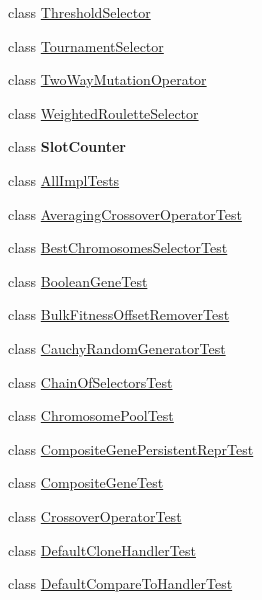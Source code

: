 \begin{DoxyCompactItemize}
\item 
class \hyperlink{classorg_1_1jgap_1_1impl_1_1_threshold_selector}{Threshold\-Selector}
\item 
class \hyperlink{classorg_1_1jgap_1_1impl_1_1_tournament_selector}{Tournament\-Selector}
\item 
class \hyperlink{classorg_1_1jgap_1_1impl_1_1_two_way_mutation_operator}{Two\-Way\-Mutation\-Operator}
\item 
class \hyperlink{classorg_1_1jgap_1_1impl_1_1_weighted_roulette_selector}{Weighted\-Roulette\-Selector}
\item 
class {\bfseries Slot\-Counter}
\item 
class \hyperlink{classorg_1_1jgap_1_1impl_1_1_all_impl_tests}{All\-Impl\-Tests}
\item 
class \hyperlink{classorg_1_1jgap_1_1impl_1_1_averaging_crossover_operator_test}{Averaging\-Crossover\-Operator\-Test}
\item 
class \hyperlink{classorg_1_1jgap_1_1impl_1_1_best_chromosomes_selector_test}{Best\-Chromosomes\-Selector\-Test}
\item 
class \hyperlink{classorg_1_1jgap_1_1impl_1_1_boolean_gene_test}{Boolean\-Gene\-Test}
\item 
class \hyperlink{classorg_1_1jgap_1_1impl_1_1_bulk_fitness_offset_remover_test}{Bulk\-Fitness\-Offset\-Remover\-Test}
\item 
class \hyperlink{classorg_1_1jgap_1_1impl_1_1_cauchy_random_generator_test}{Cauchy\-Random\-Generator\-Test}
\item 
class \hyperlink{classorg_1_1jgap_1_1impl_1_1_chain_of_selectors_test}{Chain\-Of\-Selectors\-Test}
\item 
class \hyperlink{classorg_1_1jgap_1_1impl_1_1_chromosome_pool_test}{Chromosome\-Pool\-Test}
\item 
class \hyperlink{classorg_1_1jgap_1_1impl_1_1_composite_gene_persistent_repr_test}{Composite\-Gene\-Persistent\-Repr\-Test}
\item 
class \hyperlink{classorg_1_1jgap_1_1impl_1_1_composite_gene_test}{Composite\-Gene\-Test}
\item 
class \hyperlink{classorg_1_1jgap_1_1impl_1_1_crossover_operator_test}{Crossover\-Operator\-Test}
\item 
class \hyperlink{classorg_1_1jgap_1_1impl_1_1_default_clone_handler_test}{Default\-Clone\-Handler\-Test}
\item 
class \hyperlink{classorg_1_1jgap_1_1impl_1_1_default_compare_to_handler_test}{Default\-Compare\-To\-Handler\-Test}

\end{DoxyCompactItemize}
